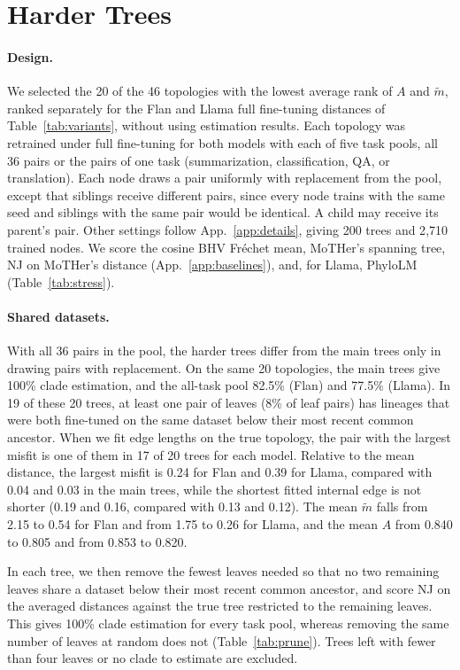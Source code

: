 \documentclass{article}
\theoremstyle{definition}
\theoremstyle{plain}
\newif\ifrevision
\newcommand{\rev}[1]{\ifrevision{\color{blue}#1}\else#1\fi}
\newcommand{\revcolor}{\ifrevision\color{blue}\fi}
\newcommand{\revtag}[1]{\ifrevision\textsuperscript{\color{blue}\sffamily\scriptsize[#1]}\fi}
\begin{document}
\section{\rev{Harder Trees}}
\label{app:stress}
{\revcolor
\paragraph{Design.}\revtag{tWEn W1, W2; S8sV Q2} We selected the 20 of the 46 topologies with the lowest average rank of $A$ and $\widetilde m$, ranked separately for the Flan and Llama full fine-tuning distances of Table~\ref{tab:variants}, without using estimation results. Each topology was retrained under full fine-tuning for both models with each of five task pools, all 36 pairs or the pairs of one task (summarization, classification, QA, or translation). Each node draws a pair uniformly with replacement from the pool, except that siblings receive different pairs, since every node trains with the same seed and siblings with the same pair would be identical. A child may receive its parent's pair. Other settings follow App.~\ref{app:details}, giving 200 trees and 2{,}710 trained nodes. We score the cosine BHV Fr\'echet mean, MoTHer's spanning tree, NJ on MoTHer's distance (App.~\ref{app:baselines}), and, for Llama, PhyloLM (Table~\ref{tab:stress}).

\paragraph{Shared datasets.} With all 36 pairs in the pool, the harder trees differ from the main trees only in drawing pairs with replacement. On the same 20 topologies, the main trees give 100\% clade estimation, and the all-task pool 82.5\% (Flan) and 77.5\% (Llama). In 19 of these 20 trees, at least one pair of leaves (8\% of leaf pairs) has lineages that were both fine-tuned on the same dataset below their most recent common ancestor. When we fit edge lengths on the true topology, the pair with the largest misfit is one of them in 17 of 20 trees for each model. Relative to the mean distance, the largest misfit is 0.24 for Flan and 0.39 for Llama, compared with 0.04 and 0.03 in the main trees, while the shortest fitted internal edge is not shorter (0.19 and 0.16, compared with 0.13 and 0.12). The mean $\widetilde m$ falls from 2.15 to 0.54 for Flan and from 1.75 to 0.26 for Llama, and the mean $A$ from 0.840 to 0.805 and from 0.853 to 0.820.

In each tree, we then remove the fewest leaves needed so that no two remaining leaves share a dataset below their most recent common ancestor, and score NJ on the averaged distances against the true tree restricted to the remaining leaves. This gives 100\% clade estimation for every task pool, whereas removing the same number of leaves at random does not (Table~\ref{tab:prune}). Trees left with fewer than four leaves or no clade to estimate are excluded.

}
\end{document}
